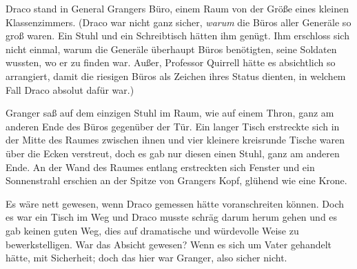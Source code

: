Draco stand in General Grangers Büro, einem Raum von der Größe eines kleinen Klassenzimmers. (Draco war nicht ganz sicher, \emph{warum} die Büros aller Generäle so groß waren. Ein Stuhl und ein Schreibtisch hätten ihm genügt. Ihm erschloss sich nicht einmal, warum die Generäle überhaupt Büros benötigten, seine Soldaten wussten, wo er zu finden war. Außer, Professor Quirrell hätte es absichtlich so arrangiert, damit die riesigen Büros als Zeichen ihres Status dienten, in welchem Fall Draco absolut dafür war.)

Granger saß auf dem einzigen Stuhl im Raum, wie auf einem Thron, ganz am anderen Ende des Büros gegenüber der Tür. Ein langer Tisch erstreckte sich in der Mitte des Raumes zwischen ihnen und vier kleinere kreisrunde Tische waren über die Ecken verstreut, doch es gab nur diesen einen Stuhl, ganz am anderen Ende. An der Wand des Raumes entlang erstreckten sich Fenster und ein Sonnenstrahl erschien an der Spitze von Grangers Kopf, glühend wie eine Krone.

Es wäre nett gewesen, wenn Draco gemessen hätte voranschreiten können. Doch es war ein Tisch im Weg und Draco musste schräg darum herum gehen und es gab keinen guten Weg, dies auf dramatische und würdevolle Weise zu bewerkstelligen. War das Absicht gewesen? Wenn es sich um Vater gehandelt hätte, mit Sicherheit; doch das hier war Granger, also sicher nicht.

